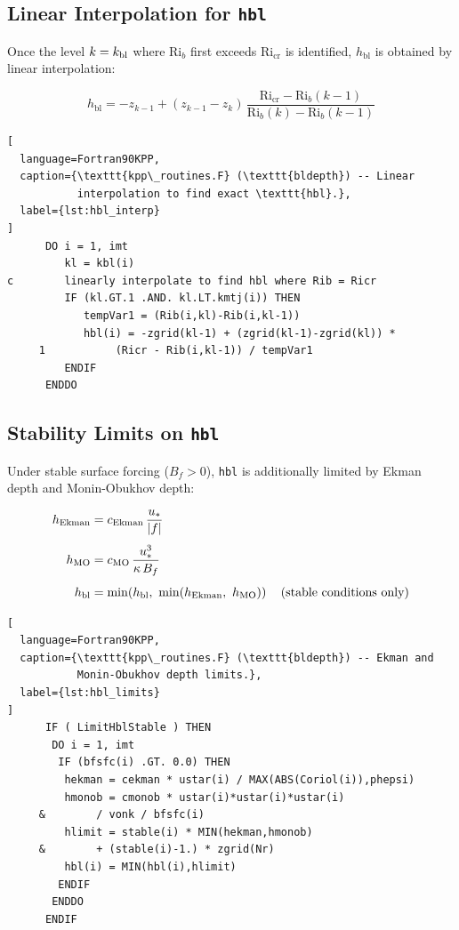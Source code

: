 \documentclass[12pt,letterpaper]{article}
\newcommand{\hbl}{h_{\mathrm{bl}}}
\newcommand{\ustar}{u_*}
\newcommand{\Ri}{\mathrm{Ri}}
\newcommand{\Ricr}{\mathrm{Ri_{cr}}}
\begin{document}
\subsection{Linear Interpolation for \texttt{hbl}}  
  
Once the level $k = k_{\rm bl}$ where $\Ri_b$ first exceeds $\Ricr$ is  
identified, $\hbl$ is obtained by linear interpolation:  
  
\begin{equation}  
\hbl = -z_{k-1} + (z_{k-1} - z_k)\,\frac{\Ricr - \Ri_b(k-1)}  
                                          {\Ri_b(k) - \Ri_b(k-1)}  
\end{equation}  
  
\begin{lstlisting}[  
  language=Fortran90KPP,  
  caption={\texttt{kpp\_routines.F} (\texttt{bldepth}) -- Linear  
           interpolation to find exact \texttt{hbl}.},  
  label={lst:hbl_interp}  
]  
      DO i = 1, imt  
         kl = kbl(i)  
c        linearly interpolate to find hbl where Rib = Ricr  
         IF (kl.GT.1 .AND. kl.LT.kmtj(i)) THEN  
            tempVar1 = (Rib(i,kl)-Rib(i,kl-1))  
            hbl(i) = -zgrid(kl-1) + (zgrid(kl-1)-zgrid(kl)) *  
     1           (Ricr - Rib(i,kl-1)) / tempVar1  
         ENDIF  
      ENDDO  
\end{lstlisting}  
  
\subsection{Stability Limits on \texttt{hbl}}  
  
Under stable surface forcing ($B_f > 0$), \texttt{hbl} is additionally  
limited by Ekman depth and Monin-Obukhov depth:  
  
\begin{align}  
h_{\rm Ekman} &= c_{\rm Ekman}\,\frac{\ustar}{|f|} \\[4pt]  
h_{\rm MO} &= c_{\rm MO}\,\frac{\ustar^3}{\kappa\,B_f} \\[4pt]  
\hbl &= \min\!\left(\hbl,\ \min(h_{\rm Ekman},\ h_{\rm MO})\right)  
\quad \text{(stable conditions only)}  
\end{align}  
  
\begin{lstlisting}[  
  language=Fortran90KPP,  
  caption={\texttt{kpp\_routines.F} (\texttt{bldepth}) -- Ekman and  
           Monin-Obukhov depth limits.},  
  label={lst:hbl_limits}  
]  
      IF ( LimitHblStable ) THEN  
       DO i = 1, imt  
        IF (bfsfc(i) .GT. 0.0) THEN  
         hekman = cekman * ustar(i) / MAX(ABS(Coriol(i)),phepsi)  
         hmonob = cmonob * ustar(i)*ustar(i)*ustar(i)  
     &        / vonk / bfsfc(i)  
         hlimit = stable(i) * MIN(hekman,hmonob)  
     &        + (stable(i)-1.) * zgrid(Nr)  
         hbl(i) = MIN(hbl(i),hlimit)  
        ENDIF  
       ENDDO  
      ENDIF  
\end{lstlisting}  
  
\end{document}
